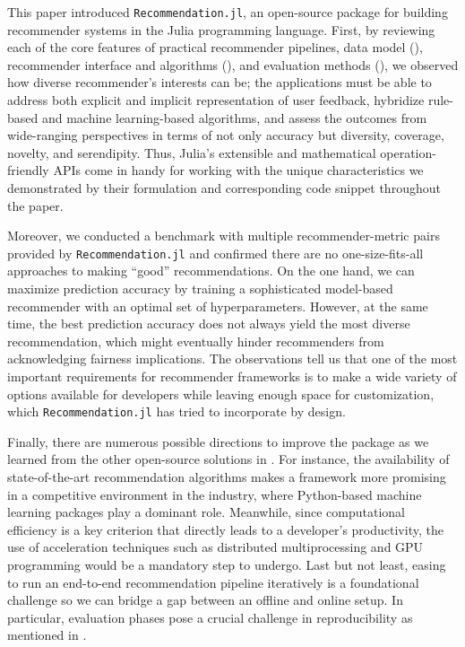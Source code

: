 This paper introduced \texttt{Recommendation.jl}, an open-source package for building recommender systems in the Julia programming language. First, by reviewing each of the core features of practical recommender pipelines, data model (), recommender interface and algorithms (), and evaluation methods (), we observed how diverse recommender's interests can be; the applications must be able to address both explicit and implicit representation of user feedback, hybridize rule-based and machine learning-based algorithms, and assess the outcomes from wide-ranging perspectives in terms of not only accuracy but diversity, coverage, novelty, and serendipity. Thus, Julia's extensible and mathematical operation-friendly APIs come in handy for working with the unique characteristics we demonstrated by their formulation and corresponding code snippet throughout the paper.

Moreover, we conducted a benchmark with multiple recommender-metric pairs provided by \texttt{Recommendation.jl} and confirmed there are no one-size-fits-all approaches to making ``good'' recommendations. On the one hand, we can maximize prediction accuracy by training a sophisticated model-based recommender with an optimal set of hyperparameters. However, at the same time, the best prediction accuracy does not always yield the most diverse recommendation, which might eventually hinder recommenders from acknowledging fairness implications. The observations tell us that one of the most important requirements for recommender frameworks is to make a wide variety of options available for developers while leaving enough space for customization, which \texttt{Recommendation.jl} has tried to incorporate by design.

Finally, there are numerous possible directions to improve the package as we learned from the other open-source solutions in . For instance, the availability of state-of-the-art recommendation algorithms makes a framework more promising in a competitive environment in the industry, where Python-based machine learning packages play a dominant role. Meanwhile, since computational efficiency is a key criterion that directly leads to a developer's productivity, the use of acceleration techniques such as distributed multiprocessing and GPU programming would be a mandatory step to undergo. Last but not least, easing to run an end-to-end recommendation pipeline iteratively is a foundational challenge so we can bridge a gap between an offline and online setup. In particular, evaluation phases pose a crucial challenge in reproducibility as mentioned in .
